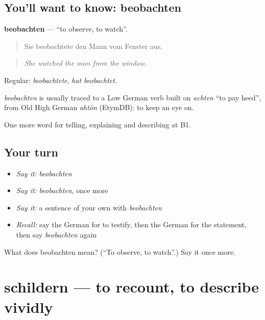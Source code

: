 \subsection*{You'll want to know: beobachten}
\textbf{beobachten} — \textquotedblleft{}to observe, to watch\textquotedblright{}.

\begin{quote}
Sie beobachtete den Mann vom Fenster aus.
\end{quote}

\begin{quote}
\emph{She watched the man from the window.}
\end{quote}

Regular: \emph{beobachtete}, \emph{hat beobachtet}.

\begin{cousinweb}
\emph{beobachten} is usually traced to a Low German verb built on \emph{achten} \textquotedblleft{}to pay heed\textquotedblright{}, from Old High German \emph{ahtōn} (EtymDB): to keep an eye on.
\end{cousinweb}

\begin{grammarlens}[title={What you've built}]
One more word for telling, explaining and describing at B1.
\end{grammarlens}

\subsection*{Your turn}
\begin{itemize}
\raggedright
  \item \emph{Say it:} \emph{beobachten}
  \item \emph{Say it:} \emph{beobachten}, once more
  \item \emph{Say it:} a sentence of your own with \emph{beobachten}
  \item \emph{Recall:} say the German for to testify, then the German for the statement, then say \emph{beobachten} again
\end{itemize}

\begin{tcolorbox}[breakable,colback=teal!4,colframe=teal!35!black,title={Before you move on}]
What does beobachten mean? (\textquotedblleft{}To observe, to watch\textquotedblright{}.) Say it once more.
\end{tcolorbox}
\section[schildern]{schildern — to recount, to describe vividly}

